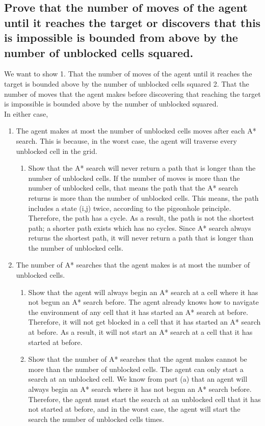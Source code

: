 \documentclass{article}
\begin{document}
\subsection{Prove that the number of moves of the agent until it reaches the target or discovers that this is impossible is bounded from above by the number of unblocked cells squared.}

We want to show 1. That the number of moves of the agent until it reaches the target is bounded above by the number of unblocked cells squared  2. That the number of moves that the agent makes before discovering that reaching the target is impossible is bounded above by the number of unblocked squared.\\

In either case, 
\begin{enumerate}
	\item The agent makes at most the number of unblocked cells moves after each A* search. This is because, in the worst case, the agent will traverse every unblocked cell in the grid. 
	\begin{enumerate}
		\item Show that the A* search will never return a path that is longer than the number of unblocked cells.  If the number of moves is more than the number of unblocked cells, that means the path that the A* search returns is more than the number of unblocked cells. This means, the path includes a state (i,j) twice, according to the pigeonhole principle. Therefore, the path has a cycle. As a result, the path is not the shortest path; a shorter path exists which has no cycles. Since A* search always returns the shortest path, it will never return a path that is longer than the number of unblocked cells.
	\end{enumerate}
	\item The number of A* searches that the agent makes is at most the number of unblocked cells.
	\begin{enumerate}
		\item Show that the agent will always begin an A* search at a cell where it has not begun an A* search before.  The agent already knows how to navigate the environment of any cell that it has started an A* search at before. Therefore, it will not get blocked in a cell that it has started an A* search at before. As a result, it will not start an A* search at a cell that it has started at before. 
		\item Show that the number of A* searches that the agent makes cannot be more than the number of unblocked cells. The agent can only start a search at an unblocked cell. We know from part (a) that an agent will always begin an A* search where it has not begun an A* search before. Therefore, the agent must start the search at an unblocked cell that it has not started at before, and in the worst case, the agent will start the search the number of unblocked cells times.
	\end{enumerate} 
\end {enumerate}
\end{document}
